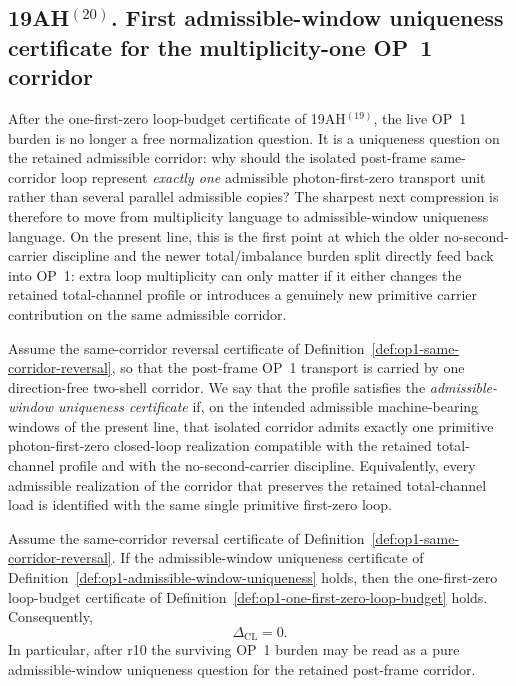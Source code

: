 \subsection*{19AH$^{(20)}$. First admissible-window uniqueness certificate for the multiplicity-one OP~1 corridor}
After the one-first-zero loop-budget certificate of 19AH$^{(19)}$, the live OP~1 burden is no longer a free normalization question. It is a uniqueness question on the retained admissible corridor: why should the isolated post-frame same-corridor loop represent \emph{exactly one} admissible photon-first-zero transport unit rather than several parallel admissible copies? The sharpest next compression is therefore to move from multiplicity language to admissible-window uniqueness language. On the present line, this is the first point at which the older no-second-carrier discipline and the newer total/imbalance burden split directly feed back into OP~1: extra loop multiplicity can only matter if it either changes the retained total-channel profile or introduces a genuinely new primitive carrier contribution on the same admissible corridor.

\begin{definition}
\label{def:op1-admissible-window-uniqueness}
Assume the same-corridor reversal certificate of Definition~\ref{def:op1-same-corridor-reversal}, so that the post-frame OP~1 transport is carried by one direction-free two-shell corridor. We say that the profile satisfies the \emph{admissible-window uniqueness certificate} if, on the intended admissible machine-bearing windows of the present line, that isolated corridor admits exactly one primitive photon-first-zero closed-loop realization compatible with the retained total-channel profile and with the no-second-carrier discipline. Equivalently, every admissible realization of the corridor that preserves the retained total-channel load is identified with the same single primitive first-zero loop.
\end{definition}

\begin{proposition}
\label{prop:op1-admissible-window-uniqueness}
Assume the same-corridor reversal certificate of Definition~\ref{def:op1-same-corridor-reversal}. If the admissible-window uniqueness certificate of Definition~\ref{def:op1-admissible-window-uniqueness} holds, then the one-first-zero loop-budget certificate of Definition~\ref{def:op1-one-first-zero-loop-budget} holds. Consequently,
\[
  \Delta_{\mathrm{CL}} = 0.
\]
In particular, after r10 the surviving OP~1 burden may be read as a pure admissible-window uniqueness question for the retained post-frame corridor.
\end{proposition}

